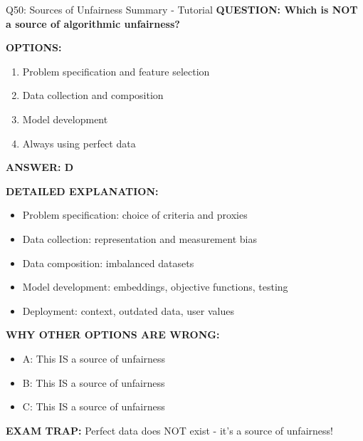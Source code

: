 \documentclass[8pt]{beamer}
\begin{document}
	\begin{frame}{Q50: Sources of Unfairness Summary - Tutorial}
		\fontsize{6.5}{7.5}\selectfont
		\textbf{QUESTION: Which is NOT a source of algorithmic unfairness?}
		
		\vspace{0.1cm}
		\textbf{OPTIONS:}
		\begin{enumerate}
			\item Problem specification and feature selection
			\item Data collection and composition
			\item Model development
			\item Always using perfect data
		\end{enumerate}
		
		\vspace{0.1cm}
		\textcolor{myblue}{\textbf{ANSWER: D}}
		
		\vspace{0.1cm}
		\textbf{DETAILED EXPLANATION:}
		\begin{itemize}
			\item Problem specification: choice of criteria and proxies
			\item Data collection: representation and measurement bias
			\item Data composition: imbalanced datasets
			\item Model development: embeddings, objective functions, testing
			\item Deployment: context, outdated data, user values\end{itemize}
		
		\vspace{0.1cm}
		\textcolor{myred}{\textbf{WHY OTHER OPTIONS ARE WRONG:}}
		\begin{itemize}
			\item \textcolor{myred}{A:} This IS a source of unfairness
			\item \textcolor{myred}{B:} This IS a source of unfairness
			\item \textcolor{myred}{C:} This IS a source of unfairness
		\end{itemize}
		
		\textcolor{myred}{\textbf{EXAM TRAP:}} Perfect data \textcolor{myblue}{does NOT exist} - it's a source of unfairness!
	\end{frame}
	
	
\end{document}
